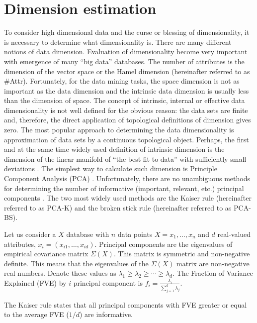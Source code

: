 \documentclass[entropy,article,submit,moreauthors,pdftex]{Definitions/mdpi}
\begin{document}
\section{Dimension estimation}\label{DimEst}
To consider high dimensional data and the curse or blessing of dimensionality, it is necessary to determine what dimensionality is. There are many different notions of data dimension. Evaluation of dimensionality become very important with emergence of many ``big data'' databases. The number of attributes is the dimension of the vector space or the Hamel dimension \cite{brown2012introduction} (hereinafter referred to as \#Attr). Fortunately, for the data mining tasks, the space dimension is not as important as the data dimension and the intrinsic data dimension is usually less than the dimension of space.
The concept of intrinsic, internal or effective data dimensionality is not well defined for the obvious reason: the data sets are finite and, therefore, the direct application of topological definitions of dimension gives zero.
The most popular approach to determining the data dimensionality is approximation of data sets by a continuous topological object. Perhaps, the first and at the same time widely used definition of intrinsic dimension is the dimension of the linear manifold of ``the best fit to data'' with sufficiently small deviations \cite{pearson1901}.
The simplest way to calculate such dimension is Principle Component Analysis (PCA) \cite{pearson1901, jobson2012applied}. Unfortunately, there are no unambiguous methods for determining the number of informative (important, relevant, etc.) principal components \cite{jackson1993stopping, ledesma2007determining, cangelosi2007component}. The two most widely used methods are the Kaiser rule \cite{guttman1954some, kaiser1960application} (hereinafter referred to as PCA-K) and the broken stick rule \cite{jackson1993stopping} (hereinafter referred to as PCA-BS).

Let us consider a $X$ database with $n$ data points $X={x_1,\ldots,x_n}$ and $d$ real-valued attributes, $x_i=(x_{i1},\ldots,x_{id})$.
Principal components are the eigenvalues of empirical covariance matrix $\Sigma(X)$. This matrix is symmetric and non-negative definite. This means that the eigenvalues of the $\Sigma(X)$ matrix are non-negative real numbers. Denote these values as $\lambda_1\ge\lambda_2\ge\cdots\ge\lambda_d$. The Fraction of Variance Explained (FVE) by $i$ principal component is $f_i=\frac{\lambda_i}{\sum_{j=1}^{d}\lambda_j}$.

The Kaiser rule states that all principal components with FVE greater or equal to the average FVE ($1/d$) are informative.
\end{document}
